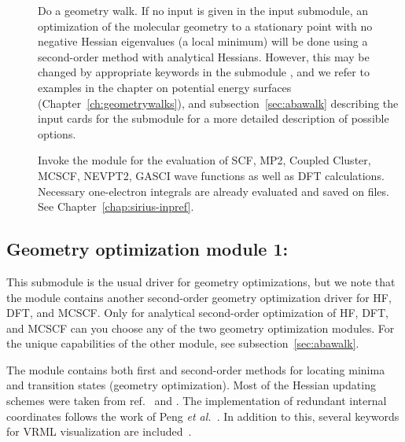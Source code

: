 \begin{description}
\item[]
Do a geometry walk.
If no input is given in the
 input submodule, an optimization of the molecular
geometry to a stationary point with no negative Hessian eigenvalues (a
local minimum) will be done using a second-order method with
analytical Hessians. However, this may be changed by appropriate
keywords in the submodule , and we refer to examples in
the chapter on potential energy surfaces
(Chapter~\ref{ch:geometrywalks}), and subsection~\ref{sec:abawalk}
describing the input cards for the  submodule for a more
detailed description of possible options.

\item[]
Invoke the {\sir} module for the evaluation of SCF, MP2, Coupled
Cluster, MCSCF, NEVPT2, GASCI wave functions as well as DFT calculations.
Necessary one-electron integrals are already evaluated and saved on files.
See Chapter~\ref{chap:sirius-inpref}.
\end{description}

%

\subsection{Geometry optimization module 1: }\label{subsec:minimize}

This submodule is the usual driver for geometry optimizations,
but we note that the  module contains another second-order
geometry optimization driver for HF, DFT, and MCSCF.
Only for analytical second-order optimization of HF, DFT, and MCSCF can you choose
any of the two geometry optimization modules.
For the unique capabilities of the other module, see subsection~\ref{sec:abawalk}.

The  module contains both first and second-order methods
for locating minima and transition states (geometry optimization).
Most of the Hessian updating schemes were taken from
ref.~\cite{thkrprt95} and \cite{Fletcher}.
The implementation of redundant internal coordinates
follows the work of Peng {\it et al.\/}~\cite{cppyahbsmjfjcc17}.
In addition to this, several keywords for VRML visualization are included~\cite{VRML}.

